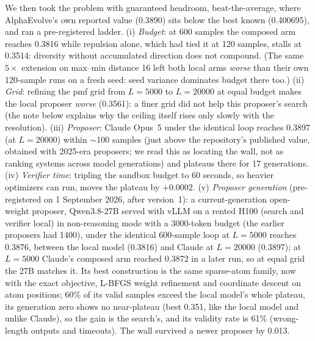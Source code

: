 \documentclass[11pt]{article}
\begin{document}
We then took the problem with guaranteed headroom, beat-the-average,
where AlphaEvolve's own reported value (0.3890) sits below the best known
(0.400695), and ran a pre-registered ladder. (i) \emph{Budget}: at 600
samples the composed arm reaches 0.3816 while repulsion alone, which had
tied it at 120 samples, stalls at 0.3514: diversity without accumulated
direction does not compound. (The same $5\times$ extension on max--min
distance 16 left both local arms \emph{worse} than their own 120-sample
runs on a fresh seed: seed variance dominates budget there too.)
(ii) \emph{Grid}: refining the pmf grid from
$L{=}5000$ to $L{=}20000$ at equal budget makes the local proposer
\emph{worse} (0.3561): a finer grid did not help this proposer's search
(the note below explains why the ceiling itself rises only slowly with
the resolution). (iii)
\emph{Proposer}: Claude Opus~5 under the identical loop reaches 0.3897
(at $L{=}20000$)
within $\sim$100 samples (just above the repository's published value,
obtained with 2025-era proposers; we read this as locating the
wall, not as ranking systems across model generations) and plateaus
there for 17 generations. (iv) \emph{Verifier time}: tripling the
sandbox budget to 60 seconds, so heavier optimizers can run, moves the
plateau by $+0.0002$. (v) \emph{Proposer generation} (pre-registered
on 1 September 2026, after version~1): a current-generation open-weight
proposer, Qwen3.8-27B served with vLLM on a rented H100 (search and
verifier local) in non-reasoning mode with a 3000-token budget (the
earlier proposers had 1400), under the identical 600-sample loop at
$L{=}5000$ reaches 0.3876, between the local model (0.3816) and Claude
at $L{=}20000$ (0.3897); at $L{=}5000$ Claude's composed arm reached
0.3872 in a later run, so at equal grid the 27B matches it. Its best
construction is the same sparse-atom family, now with the exact
objective, L-BFGS weight refinement and coordinate descent on atom
positions; 60\% of its valid samples exceed the local model's whole
plateau, its generation zero shows no near-plateau (best 0.351, like
the local model and unlike Claude), so the gain is the search's, and
its validity rate is 61\% (wrong-length outputs and timeouts). The
wall survived a newer proposer by 0.013.
\end{document}
